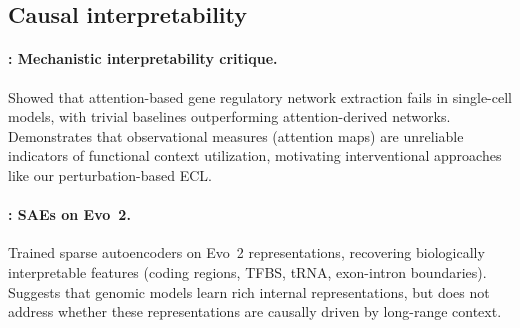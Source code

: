 \subsection{Causal interpretability}

\paragraph{\citet{Kendiukhov2026MechInterp}: Mechanistic interpretability critique.}
Showed that attention-based gene regulatory network extraction fails in single-cell models, with trivial baselines outperforming attention-derived networks. Demonstrates that observational measures (attention maps) are unreliable indicators of functional context utilization, motivating interventional approaches like our perturbation-based ECL.

\paragraph{\citet{Goodfire2025Evo2}: SAEs on Evo~2.}
Trained sparse autoencoders on Evo~2 representations, recovering biologically interpretable features (coding regions, TFBS, tRNA, exon-intron boundaries). Suggests that genomic models learn rich internal representations, but does not address whether these representations are causally driven by long-range context.
